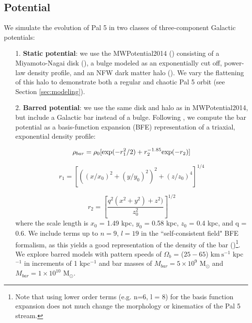 \documentclass[modern]{aastex62}
\newcommand{\msun}{\textrm{M}_\odot}
\newcommand{\kms}{\ensuremath{\textrm{km}~\textrm{s}^{-1}}}
\begin{document}
\subsection{Potential}
\label{sec:potential}
We simulate the evolution of Pal 5 in two classes of three-component Galactic potentials: 

\begin{itemize}
\item[1.] {\bf Static potential}: we use the {\small MWPotential2014} (\citealt{Bovy:2015}) consisting of a Miyamoto-Nagai disk (\citealt{Miyamoto:1975}), a bulge modeled as an exponentially cut off, power-law density profile, and an NFW dark matter halo (\citealt{Navarro:1996}). We vary the flattening of this halo to demonstrate both a regular and chaotic Pal 5 orbit (see Section \ref{sec:modeling}). 

\item[2.] {\bf  Barred potential}: we use the same disk and halo as in {\small MWPotential2014}, but include a Galactic bar instead of a bulge. Following \citet{wang:2012}, we compute the bar potential as a basis-function expansion (BFE) representation of a triaxial, exponential density profile:

\begin{equation}
\rho_{bar} = \rho_0 [{\rm exp} (-r^2_1/2) + r_2^{-1.85} {\rm exp}(-r_2) ]
\end{equation}

\begin{equation}
r_1 = \left[((x/x_0)^2 + (y/y_0)^2)^2 +( z/z_0)^4\right]^{1/4}
\end{equation}

\begin{equation}
r_2 = \left[\frac{q^2(x^2 + y^2) + z^2)}{z_0^2}\right]^{1/2}
\end{equation}
where the scale length is $x_0$ = 1.49 kpc, $y_0$ = 0.58 kpc, $z_0$ = 0.4 kpc, and q = 0.6. We include terms up to $n=9$, $l=19$ in the ``self-consistent field" BFE formalism, as this yields a good representation of the density of the bar (\citealt{Banik:2019})\footnote{Note that using lower order terms (e.g. n=6, l = 8) for the basis function expansion does not much change the morphology or kinematics of the Pal 5 stream.}. We explore barred models with pattern speeds of $\Omega_b$ = ($25 - 65$) $\kms$ kpc$^{-1}$ in increments of 1 kpc$^{-1}$ and bar masses of $M_{bar} = 5 \times 10^{9}$ $\msun$ and $M_{bar} = 1 \times 10^{10}$ $\msun$.
\end{itemize}
\end{document}
